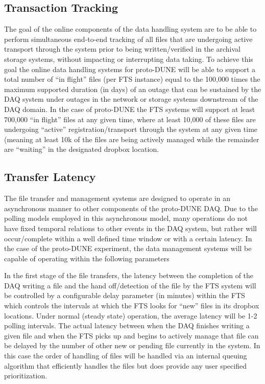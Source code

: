 \documentclass[pdftex,12pt,letter]{article}
\begin{document}
\subsection{Transaction Tracking}
The goal of the online components of the data handling system are to be able to perform simultaneous end-to-end tracking of all files that are undergoing active transport through the system prior to being written/verified in the archival storage systems, without impacting or interrupting data taking.  To achieve this goal the online data handling systems for proto-DUNE will be able to support a total number of “in flight” files (per FTS instance) equal to the 100,000 times the maximum supported duration (in days) of an outage that can be sustained by the DAQ system under outages in the network or storage systems downstream of the DAQ domain.
In the case of proto-DUNE the FTS systems will support at least 700,000 “in flight” files at any given time, where at least 10,000 of these files are undergoing “active” registration/transport through the system at any given time (meaning at least 10k of the files are being actively managed while the remainder are “waiting” in the designated dropbox location.

\subsection{Transfer Latency}
The file transfer and management systems are designed to operate in an asynchronous manner to other components of the proto-DUNE DAQ.  Due to the polling models employed in this asynchronous model, many operations do not have fixed temporal relations to other events in the DAQ system, but rather will occur/complete within a well defined time window or with a certain latency.  In the case of the proto-DUNE experiment, the data management systems will be capable of operating within the following parameters

In the first stage of the file transfers, the latency between the completion of the DAQ writing a file and the hand off/detection of the file by the FTS system will be controlled by a configurable delay parameter (in minutes) within the FTS which controls the intervals at which the FTS looks for “new” files in its dropbox locations.  Under normal (steady state) operation, the average latency will be 1-2 polling intervals.  The actual latency between when the DAQ finishes writing a given file and when the FTS picks up and begins to actively manage that file can be delayed by the number of other new or pending file currently in the system.  In this case the order of handling of files will be handled via an internal queuing algorithm that efficiently handles the files but does provide any user specified prioritization.
\end{document}
